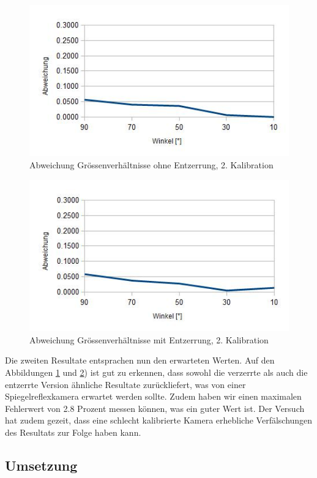 \begin{figure}[!ht]
  \centering
  \includegraphics[width=0.75\linewidth]{images/ratio_v2_dist.jpg}
  \caption{Abweichung Grössenverhältnisse ohne Entzerrung, 2. Kalibration}
  \label{fig:ratio-v2-dist}
\end{figure}

\begin{figure}[!ht]
  \centering
  \includegraphics[width=0.75\linewidth]{images/ratio_v2_undist.jpg}
  \caption{Abweichung Grössenverhältnisse mit Entzerrung, 2. Kalibration}
  \label{fig:ratio-v2-undist}
\end{figure}


Die zweiten Resultate entsprachen nun den erwarteten Werten. Auf den Abbildungen \ref{fig:ratio-v2-dist} und \ref{fig:ratio-v2-undist}) ist gut zu erkennen, dass sowohl die verzerrte als auch die entzerrte Version ähnliche Resultate zurückliefert, was von einer Spiegelreflexkamera erwartet werden sollte. Zudem haben wir einen maximalen Fehlerwert von 2.8 Prozent messen können, was ein guter Wert ist. Der Versuch hat zudem gezeit, dass eine schlecht kalibrierte Kamera erhebliche Verfälschungen des Resultats zur Folge haben kann. 


\subsection{Umsetzung}
\label{sec:projektion-door}

